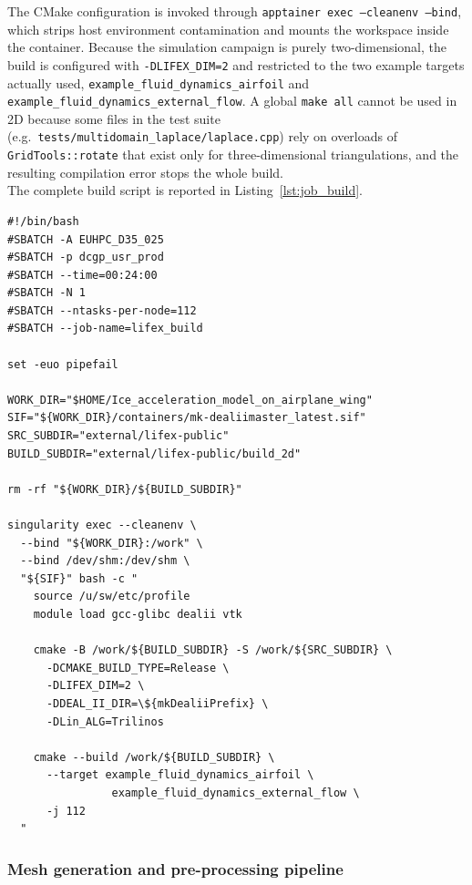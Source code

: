 \vspace{2ex}

The CMake configuration is invoked through \texttt{apptainer exec --cleanenv --bind}, which strips host environment contamination and mounts the workspace inside the container. Because the simulation campaign is purely two-dimensional, the build is configured with \texttt{-DLIFEX\_DIM=2} and restricted to the two example targets actually used, \texttt{example\_fluid\_dynamics\_airfoil} and \texttt{example\_fluid\_dynamics\_external\_flow}. A global \texttt{make all} cannot be used in 2D because some files in the test suite (e.g.\ \texttt{tests/multidomain\_laplace/laplace.cpp}) rely on overloads of \texttt{GridTools::rotate} that exist only for three-dimensional triangulations, and the resulting compilation error stops the whole build.\\
The complete build script is reported in Listing~\ref{lst:job_build}.

\begin{lstlisting}[style=bashstyle, caption={SLURM build script for LifeX on Leonardo (\texttt{job\_build\_leonardo.sh}). The Apptainer image is invoked through the legacy \texttt{singularity} command alias.}, label={lst:job_build}]
#!/bin/bash
#SBATCH -A EUHPC_D35_025
#SBATCH -p dcgp_usr_prod
#SBATCH --time=00:24:00
#SBATCH -N 1
#SBATCH --ntasks-per-node=112
#SBATCH --job-name=lifex_build

set -euo pipefail

WORK_DIR="$HOME/Ice_acceleration_model_on_airplane_wing"
SIF="${WORK_DIR}/containers/mk-dealiimaster_latest.sif"
SRC_SUBDIR="external/lifex-public"
BUILD_SUBDIR="external/lifex-public/build_2d"

rm -rf "${WORK_DIR}/${BUILD_SUBDIR}"

singularity exec --cleanenv \
  --bind "${WORK_DIR}:/work" \
  --bind /dev/shm:/dev/shm \
  "${SIF}" bash -c "
    source /u/sw/etc/profile
    module load gcc-glibc dealii vtk

    cmake -B /work/${BUILD_SUBDIR} -S /work/${SRC_SUBDIR} \
      -DCMAKE_BUILD_TYPE=Release \
      -DLIFEX_DIM=2 \
      -DDEAL_II_DIR=\${mkDealiiPrefix} \
      -DLin_ALG=Trilinos

    cmake --build /work/${BUILD_SUBDIR} \
      --target example_fluid_dynamics_airfoil \
                example_fluid_dynamics_external_flow \
      -j 112
  "
\end{lstlisting}

\subsubsection{Mesh generation and pre-processing pipeline}\label{sec:mesh}

